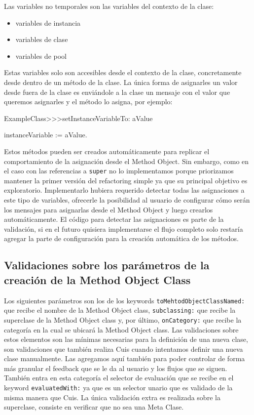 Las variables no temporales son las variables del contexto de la clase:

\begin{itemize}
    \item variables de instancia
    \item variables de clase
    \item variables de pool
\end{itemize}

Estas variables solo son accesibles desde el contexto de la clase, concretamente desde dentro de
un método de la clase. La única forma de asignarles un valor desde fuera de la clase es enviándole
a la clase un mensaje con el valor que queremos asignarles y el método lo asigna, por ejemplo:

\begin{code}
ExampleClass>>>setInstanceVariableTo: aValue

    instanceVariable := aValue.
\end{code}

Estos métodos pueden ser creados automáticamente para replicar el comportamiento de la asignación
desde el Method Object. Sin embargo, como en el caso con las referencias a \lstinline{super} no lo
implementamos porque priorizamos mantener la primer versión del refactoring simple ya que su principal
objetivo es exploratorio. Implementarlo hubiera requerido detectar todas las asignaciones a este tipo 
de variables, ofrecerle la posibilidad al usuario de configurar cómo serán los mensajes para asignarlas
desde el Method Object y luego crearlos automáticamente. El código para detectar las asignaciones
es parte de la validación, si en el futuro quisiera implementarse el flujo completo solo restaría
agregar la parte de configuración para la creación automática de los métodos.



\subsection*{Validaciones sobre los parámetros de la creación de la Method Object Class}

Los siguientes parámetros son los de los keywords \lstinline{toMehtodObjectClassNamed:} que recibe
el nombre de la Method Object class, \lstinline{subclassing:} que recibe la superclase de la Method
Object class y, por último, \lstinline{onCategory:} que recibe la categoría en la cual se ubicará la
Method Object class. Las validaciones sobre estos elementos son las mínimas necesarias para la
definición de una nueva clase, son validaciones que también realiza Cuis cuando intentamos definir
una nueva clase manualmente. Las agregamos aquí también para poder controlar de forma más granular
el feedback que se le da al usuario y los flujos que se siguen. También entra en esta categoría
el selector de evaluación que se recibe en el keyword \lstinline{evaluatedWith:} ya que es un selector
unario que es validado de la misma manera que Cuis.
La única validación extra es realizada sobre la superclase, consiste en verificar que no sea una
Meta Clase.



